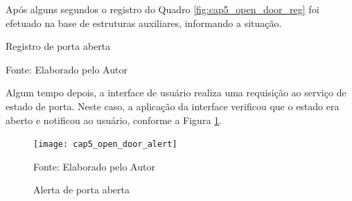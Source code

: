 Após alguns segundos o registro do Quadro \ref{fig:cap5_open_door_reg} foi efetuado na base de estruturas auxiliares, informando a situação.


\begin{quadro}[H]
    \caption{Registro de porta aberta}
    \label{fig:cap5_open_door_reg}
    
    \footnotesize{Fonte: Elaborado pelo Autor}
\end{quadro}

Algum tempo depois, a interface de usuário realiza uma requisição ao serviço de estado de porta. Neste caso, a aplicação da interface verificou que o estado era aberto e notificou ao usuário, conforme a Figura \ref{fig:cap5_open_door_alert}.


\begin{figure}[H]
    \caption{Alerta de porta aberta}
    \label{fig:cap5_open_door_alert}
    \texttt{[image: cap5\_open\_door\_alert]}
    
    \footnotesize{Fonte: Elaborado pelo Autor}
\end{figure}




